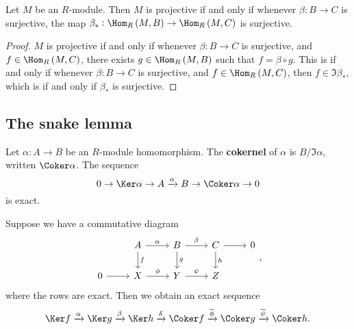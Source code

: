 \begin{proposition}
Let $ M $ be an $ R $-module. Then $ M $ is projective if and only if whenever $ \beta : B \to C $ is surjective, the map $ \beta_* : \Hom_R\br{M, B} \to \Hom_R\br{M, C} $ is surjective.
\end{proposition}

\begin{proof}
$ M $ is projective if and only if whenever $ \beta : B \to C $ is surjective, and $ f \in \Hom_R\br{M, C} $, there exists $ g \in \Hom_R\br{M, B} $ such that $ f = \beta \circ g $. This is if and only if whenever $ \beta : B \to C $ is surjective, and $ f \in \Hom_R\br{M, C} $, then $ f \in \Im \beta_* $, which is if and only if $ \beta_* $ is surjective.
\end{proof}

\subsection{The snake lemma}


Let $ \alpha : A \to B $ be an $ R $-module homomorphism. The \textbf{cokernel} of $ \alpha $ is $ B / \Im \alpha $, written $ \Coker \alpha $. The sequence
$$ 0 \to \Ker \alpha \to A \xrightarrow{\alpha} B \to \Coker \alpha \to 0 $$
is exact.

\begin{lemma}
Suppose we have a commutative diagram
$$
\begin{tikzcd}
& A \arrow{r}{\alpha} \arrow{d}{f} & B \arrow{r}{\beta} \arrow{d}{g} & C \arrow{r} \arrow{d}{h} & 0 \\
0 \arrow{r} & X \arrow{r}{\phi} & Y \arrow{r}{\psi} & Z &
\end{tikzcd},
$$
where the rows are exact. Then we obtain an exact sequence
$$ \Ker f \xrightarrow{\alpha} \Ker g \xrightarrow{\beta} \Ker h \xrightarrow{\delta} \Coker f \xrightarrow{\overline{\phi}} \Coker g \xrightarrow{\overline{\psi}} \Coker h. $$
\end{lemma}

\pagebreak

